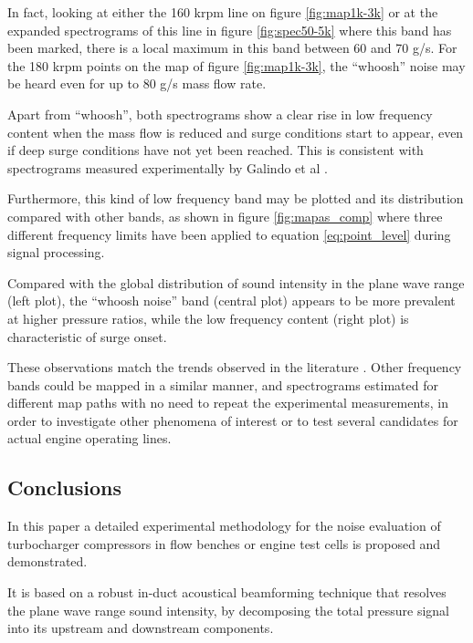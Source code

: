 In fact, looking at either the 160 krpm line on figure \ref{fig:map1k-3k} or at the expanded spectrograms of this line in figure \ref{fig:spec50-5k} where this band has been marked, there is a local maximum in this band between 60 and 70 g/s. For the 180 krpm points on the map of figure \ref{fig:map1k-3k}, the ``whoosh'' noise may be heard even for up to 80 g/s mass flow rate.

Apart from ``whoosh'', both spectrograms show a clear rise in low frequency content when the mass flow is reduced and surge conditions start to appear, even if deep surge conditions have not yet been reached. This is consistent with spectrograms measured experimentally by Galindo et al \cite{galindo2009effect}.

Furthermore, this kind of low frequency band may be plotted and its distribution compared with other bands, as shown in figure \ref{fig:mapas_comp} where three different frequency limits have been applied to equation \ref{eq:point_level} during signal processing.

Compared with the global distribution of sound intensity in the plane wave range (left plot), the ``whoosh noise'' band (central plot) appears to be more prevalent at higher pressure ratios, while the low frequency content (right plot) is characteristic of surge onset.

These observations match the trends observed in the literature \cite{evans2005minimizing,evans2006reduction,sevginer2007investigation}. Other frequency bands could be mapped in a similar manner, and spectrograms estimated for different map paths with no need to repeat the experimental measurements, in order to investigate other phenomena of interest or to test several candidates for actual engine operating lines.

\subsection{Conclusions}
\label{sec:conclusions}

In this paper a detailed experimental methodology for the noise evaluation of turbocharger compressors in flow benches \cite{broatch2015simulations} or engine test cells \cite{torregrosa2014aco} is proposed and demonstrated.

It is based on a robust in-duct acoustical beamforming technique that resolves the plane wave range sound intensity, by decomposing the total pressure signal into its upstream and downstream components.

